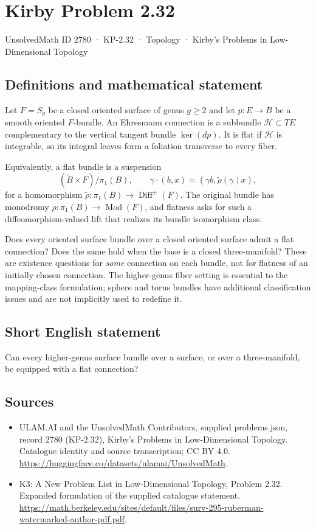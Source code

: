 \documentclass[11pt,a4paper]{article}
\begin{document}
\section*{Kirby Problem 2.32}\label{2780}
{\small UnsolvedMath ID 2780 · KP-2.32 · Topology · Kirby's Problems in Low-Dimensional Topology}
\subsection{Definitions and mathematical statement}
Let $F=S_g$ be a closed oriented surface of genus $g\geq2$ and let
$p:E\to B$ be a smooth oriented $F$-bundle. An Ehresmann connection is a
subbundle $\mathcal H\subset TE$ complementary to the vertical tangent bundle
$\ker(dp)$. It is flat if $\mathcal H$ is integrable, so its integral leaves
form a foliation transverse to every fiber.

Equivalently, a flat bundle is a suspension
\[
 (\widetilde B\times F)/\pi_1(B),\qquad
 \gamma\cdot(b,x)=(\gamma b,\widetilde\rho(\gamma)x),
\]
for a homomorphism $\widetilde\rho:\pi_1(B)\to\operatorname{Diff}^+(F)$.
The original bundle has monodromy
$\rho:\pi_1(B)\to\operatorname{Mod}(F)$, and flatness asks for such a
diffeomorphism-valued lift that realizes its bundle isomorphism class.

Does every oriented surface bundle over a closed oriented surface admit a
flat connection? Does the same hold when the base is a closed three-manifold?
These are existence questions for \emph{some} connection on each bundle, not
for flatness of an initially chosen connection. The higher-genus fiber setting
is essential to the mapping-class formulation; sphere and torus bundles have
additional classification issues and are not implicitly used to redefine it.
\subsection{Short English statement}
Can every higher-genus surface bundle over a surface, or over a three-manifold, be equipped with a flat connection?
\subsection{Sources}
\begin{itemize}
\item[S1] ULAM.AI and the UnsolvedMath Contributors, supplied problems.json, record 2780 (KP-2.32), Kirby's Problems in Low-Dimensional Topology. Catalogue identity and source transcription; CC BY 4.0.
\url{https://huggingface.co/datasets/ulamai/UnsolvedMath}.
\item[S2] K3: A New Problem List in Low-Dimensional Topology, Problem 2.32. Expanded formulation of the supplied catalogue statement.
\url{https://math.berkeley.edu/sites/default/files/surv-295-ruberman-watermarked-author-pdf.pdf}.
\end{itemize}
\end{document}
